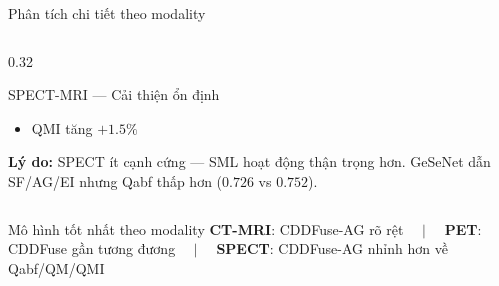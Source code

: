 \documentclass[t, aspectratio=169]{beamer}
\begin{document}
\begin{frame}{Phân tích chi tiết theo modality}
\begin{columns}[T]
\begin{column}{0.32\textwidth}
\begin{block}{\small SPECT-MRI --- Cải thiện ổn định}
\begin{itemize}
                    \item QMI tăng $+1.5\%$
                \end{itemize}
                \vspace{0.3em}
                \textbf{Lý do:} SPECT ít cạnh cứng --- SML hoạt động thận trọng hơn. GeSeNet dẫn SF/AG/EI nhưng Qabf thấp hơn ($0.726$ vs $0.752$).
            \end{block}
        \end{column}
    \end{columns}
    \vspace{0.3em}
    \begin{alertblock}{\small Mô hình tốt nhất theo modality}
        \centering\small \textbf{CT-MRI}: CDDFuse-AG rõ rệt $\quad|\quad$ \textbf{PET}: CDDFuse gần tương đương $\quad|\quad$ \textbf{SPECT}: CDDFuse-AG nhỉnh hơn về Qabf/QM/QMI
    \end{alertblock}
\end{frame}
\end{document}

